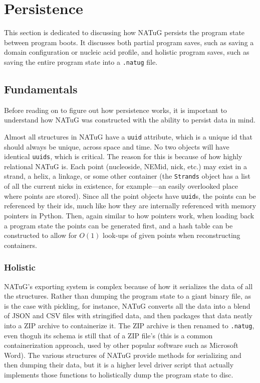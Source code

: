 \documentclass[titlepage]{article}
\begin{document}
	\section{Persistence}
	This section is dedicated to discussing how NATuG persists the program state between program boots. It discusses both partial program saves, such as saving a domain configuration or nucleic acid profile, and holistic program saves, such as saving the entire program state into a \texttt{.natug} file.
	
	\subsection{Fundamentals}
	Before reading on to figure out how persistence works, it is important to understand how NATuG was constructed with the ability to persist data in mind. 
	
	Almost all structures in NATuG have a \texttt{uuid} attribute, which is a unique id that should always be unique, across space and time. No two objects will have identical \texttt{uuids}, which is critical. The reason for this is because of how highly relational NATuG is. Each point (nucleoside, NEMid, nick, etc.) may exist in a strand, a helix, a linkage, or some other container (the \texttt{Strands} object has a list of all the current nicks in existence, for example---an easily overlooked place where points are stored). Since all the point objects have \texttt{uuid}s, the points can be referenced by their ids, much like how they are internally referenced with memory pointers in Python. Then, again similar to how pointers work, when loading back a program state the points can be generated first, and a hash table can be constructed to allow for $O(1)$ look-ups of given points when reconstructing containers.
	
	\subsubsection{Holistic}
	
	NATuG's exporting system is complex because of how it serializes the data of all the structures. Rather than dumping the program state to a giant binary file, as is the case with pickling, for instance, NATuG converts all the data into a blend of JSON and CSV files with stringified data, and then packages that data neatly into a ZIP archive to containerize it. The ZIP archive is then renamed to \texttt{.natug}, even thoguh its schema is still that of a ZIP file's (this is a common containerization approach, used by other popular software such as Microsoft Word). The various structures of NATuG provide methods for serializing and then dumping their data, but it is a higher level driver script that actually implements those functions to holistically dump the  program state to disc.
	
\end{document}
